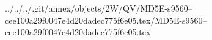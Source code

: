 ../../../.git/annex/objects/2W/QV/MD5E-s9560--cee100a29f0047e4d20dadec775f6e05.tex/MD5E-s9560--cee100a29f0047e4d20dadec775f6e05.tex